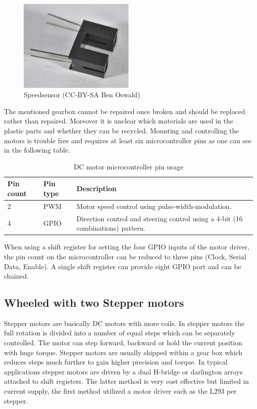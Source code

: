 \begin{figure}[H]
  \centering
  \includegraphics[width=0.5\textwidth]{images/30_speedsensor.jpg}
  \caption{Speedsensor (CC-BY-SA Ben Oswald)}
\end{figure}

The mentioned gearbox cannot be repaired once broken and should be replaced rather than repaired. Moreover it is unclear which materials are used in the plastic parts and whether they can be recycled. Mounting and controlling the motors is trouble free and requires at least six microcontroller pins as one can see in the following table.

\begin{table}[H]
\centering
\begin{tabular}{p{}p{}p{}}
\toprule
Pin count & Pin type & Description \\
\midrule
2 & PWM  & Motor speed control using pulse-width-modulation.\\
4 & GPIO & Direction control and steering control using a 4-bit (16 combinations) pattern.\\
\bottomrule
\end{tabular}
\caption{DC motor microcontroller pin usage}
\label{tbl:dc_pin}
\end{table}

When using a shift register for setting the four GPIO inputs of the motor driver, the pin count on the microcontroller can be reduced to three pins (Clock, Serial Data, Enable).  A single shift register can provide eight GPIO port and can be chained. 


\subsection{Wheeled with two Stepper motors}
Stepper motors are basically DC motors with more coils. In stepper motors the full rotation is divided into a number of equal steps which can be separately controlled. The motor can step forward, backward or hold the current position with huge torque. Stepper motors are usually shipped within a gear box which reduces steps much further to gain higher precision and torque. 
In typical applications stepper motors are driven by a dual H-bridge or darlington arrays attached to shift registers. The latter method is very cost effective but limited in current supply, the first method utilized a motor driver such as the L293 per stepper.

